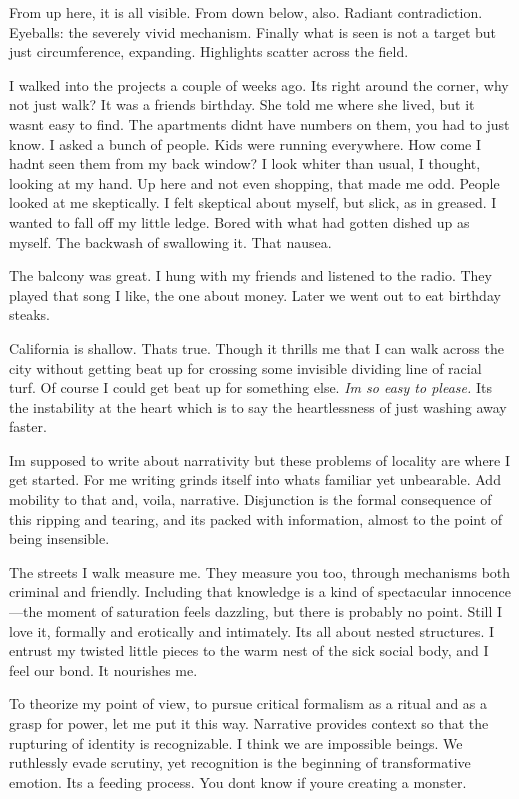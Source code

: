 From up here, it is all visible. From down below, also. Radiant
contradiction. Eyeballs: the severely vivid mechanism. Finally what is
seen is not a target but just circumference, expanding. Highlights
scatter across the field.

I walked into the projects a couple of weeks ago. Its right around the
corner, why not just walk? It was a friends birthday. She told me where
she lived, but it wasnt easy to find. The apartments didnt have numbers
on them, you had to just know. I asked a bunch of people. Kids were
running everywhere. How come I hadnt seen them from my back window? I
look whiter than usual, I thought, looking at my hand. Up here and not
even shopping, that made me odd. People looked at me skeptically. I felt
skeptical about myself, but slick, as in greased. I wanted to fall off
my little ledge. Bored with what had gotten dished up as myself. The
backwash of swallowing it. That nausea.

The balcony was great. I hung with my friends and listened to the radio.
They played that song I like, the one about money. Later we went out to
eat birthday steaks.

California is shallow. Thats true. Though it thrills me that I can walk
across the city without getting beat up for crossing some invisible
dividing line of racial turf. Of course I could get beat up for
something else. \emph{Im so easy to please.} Its the instability at the
heart which is to say the heartlessness of just washing away faster.

Im supposed to write about narrativity but these problems of locality
are where I get started. For me writing grinds itself into whats
familiar yet unbearable. Add mobility to that and, voila, narrative.
Disjunction is the formal consequence of this ripping and tearing, and
its packed with information, almost to the point of being insensible.

The streets I walk measure me. They measure you too, through mechanisms
both criminal and friendly. Including that knowledge is a kind of
spectacular innocence---the moment of saturation feels dazzling, but
there is probably no point. Still I love it, formally and erotically and
intimately. Its all about nested structures. I entrust my twisted little
pieces to the warm nest of the sick social body, and I feel our bond. It
nourishes me.

To theorize my point of view, to pursue critical formalism as a ritual
and as a grasp for power, let me put it this way. Narrative provides
context so that the rupturing of identity is recognizable. I think we
are impossible beings. We ruthlessly evade scrutiny, yet recognition is
the beginning of transformative emotion. Its a feeding process. You dont
know if youre creating a monster.

